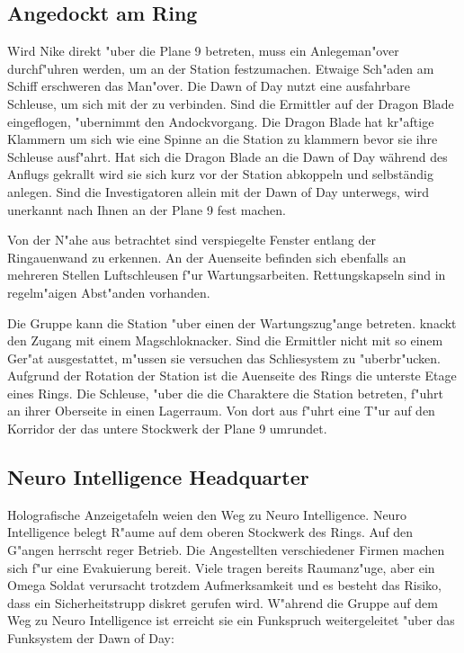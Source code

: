 \subsection{Angedockt am Ring}
Wird Nike direkt "uber die Plane 9 betreten, muss ein Anlegeman"over durchf"uhren werden, um an der Station festzumachen. Etwaige Sch"aden am Schiff erschweren das Man"over. Die Dawn of Day nutzt eine ausfahrbare Schleuse, um sich mit der zu verbinden. Sind die Ermittler auf der Dragon Blade eingeflogen, "ubernimmt \xl{} den Andockvorgang. Die Dragon Blade hat kr"aftige Klammern um sich wie eine Spinne an die Station zu klammern bevor sie ihre Schleuse ausf"ahrt. Hat sich die Dragon Blade an die Dawn of Day während des Anflugs gekrallt wird sie sich kurz vor der Station abkoppeln und selbständig anlegen. Sind die Investigatoren allein mit der Dawn of Day unterwegs, wird \xl{} unerkannt nach Ihnen an der Plane 9 fest machen.

Von der N"ahe aus betrachtet sind verspiegelte Fenster entlang der Ringau\3enwand zu erkennen. An der Au\3enseite befinden sich ebenfalls an mehreren Stellen Luftschleusen f"ur Wartungsarbeiten. Rettungskapseln sind in regelm"a\3igen Abst"anden vorhanden.

Die Gruppe kann die Station "uber einen der Wartungszug"ange betreten. \xl{} knackt den Zugang mit einem Magschlo\3knacker. Sind die Ermittler nicht mit so einem Ger"at ausgestattet, m"ussen sie versuchen das Schlie\3system zu "uberbr"ucken. Aufgrund der Rotation der Station ist die Au\3enseite des Rings die unterste Etage eines Rings. Die Schleuse, "uber die die Charaktere die Station betreten, f"uhrt an ihrer Oberseite in einen Lagerraum. Von dort aus f"uhrt eine T"ur auf den Korridor der das untere Stockwerk der Plane 9 umrundet. 

\subsection{Neuro Intelligence Headquarter}
Holografische Anzeigetafeln wei\3en den Weg zu Neuro Intelligence. Neuro Intelligence belegt R"aume auf dem oberen Stockwerk des Rings. Auf den G"angen herrscht reger Betrieb. Die Angestellten verschiedener Firmen machen sich f"ur eine Evakuierung bereit. Viele tragen bereits Raumanz"uge, aber ein Omega Soldat verursacht trotzdem Aufmerksamkeit und es besteht das Risiko, dass ein Sicherheitstrupp diskret gerufen wird. W"ahrend die Gruppe auf dem Weg zu Neuro Intelligence ist erreicht sie ein Funkspruch weitergeleitet "uber das Funksystem der Dawn of Day:


